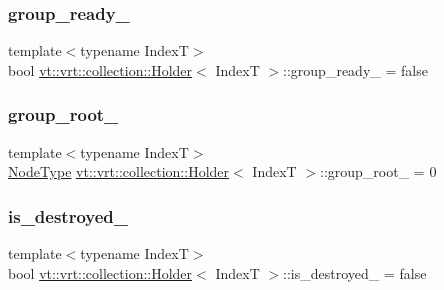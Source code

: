 \subsubsection{\texorpdfstring{group\+\_\+ready\+\_\+}{group\_ready\_}}
{\footnotesize\ttfamily template$<$typename IndexT$>$ \\
bool \hyperlink{structvt_1_1vrt_1_1collection_1_1_holder}{vt\+::vrt\+::collection\+::\+Holder}$<$ IndexT $>$\+::group\+\_\+ready\+\_\+ = false\hspace{0.3cm}{\ttfamily [private]}}

\mbox{\label{structvt_1_1vrt_1_1collection_1_1_holder_ade00ee9b6c49770e4ecf0d2920bb841b}} 
\subsubsection{\texorpdfstring{group\+\_\+root\+\_\+}{group\_root\_}}
{\footnotesize\ttfamily template$<$typename IndexT$>$ \\
\hyperlink{namespacevt_a866da9d0efc19c0a1ce79e9e492f47e2}{Node\+Type} \hyperlink{structvt_1_1vrt_1_1collection_1_1_holder}{vt\+::vrt\+::collection\+::\+Holder}$<$ IndexT $>$\+::group\+\_\+root\+\_\+ = 0\hspace{0.3cm}{\ttfamily [private]}}

\mbox{\label{structvt_1_1vrt_1_1collection_1_1_holder_a2deaf94120926bbab4dfcc818ea4087e}} 
\subsubsection{\texorpdfstring{is\+\_\+destroyed\+\_\+}{is\_destroyed\_}}
{\footnotesize\ttfamily template$<$typename IndexT$>$ \\
bool \hyperlink{structvt_1_1vrt_1_1collection_1_1_holder}{vt\+::vrt\+::collection\+::\+Holder}$<$ IndexT $>$\+::is\+\_\+destroyed\+\_\+ = false\hspace{0.3cm}{\ttfamily [private]}}


